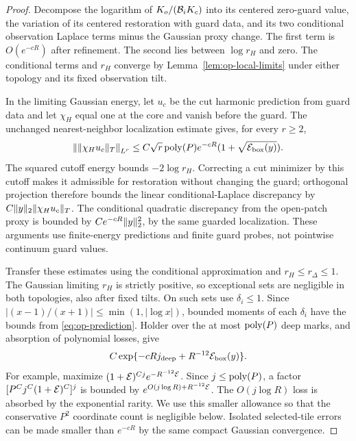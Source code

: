 \begin{proof}
Decompose the logarithm of
\(K_o/({\cal B}_iK_c)\) into its centered zero-guard value,
the variation of its centered restoration with guard data,
and its two conditional observation Laplace terms minus
the Gaussian proxy change.  The first term is
\(O(e^{-cR})\) after refinement.  The second lies between
\(\log r_H\) and zero.  The conditional terms and \(r_H\)
converge by Lemma~\ref{lem:op-local-limits} under either
topology and its fixed observation tilt.

In the limiting Gaussian energy, let \(u_c\) be the cut
harmonic prediction from guard data and let \(\chi_H\)
equal one at the core and vanish before the guard.
The unchanged nearest-neighbor localization estimate
 gives, for every \(r\geq2\),
\begin{equation}\label{eq:op-prediction}
 \left\|\lVert \chi_Hu_c\rVert_T\right\|_{L^r}
 \leq C\sqrt r\,{\rm poly}(P)e^{-cR}
                         (1+\sqrt{{\cal E}_{\rm box}(y)}).
\end{equation}
The squared cutoff energy bounds \(-2\log r_H\).
Correcting a cut minimizer by this cutoff makes it
admissible for restoration without changing the guard;
orthogonal projection therefore bounds the linear
conditional-Laplace discrepancy by
\(C\lVert y\rVert_2\lVert \chi_Hu_c\rVert_T\).
The conditional quadratic discrepancy from the open-patch
proxy is bounded by \(Ce^{-cR}\lVert y\rVert_2^2\), by the same
guarded localization.  These arguments use finite-energy
predictions and finite guard probes, not pointwise
continuum guard values.

Transfer these estimates using the conditional approximation
and \(r_H\leq r_\Delta\leq1\).  The Gaussian limiting
\(r_H\) is strictly positive, so exceptional sets are
negligible in both topologies, also after fixed tilts.
On such sets use \(\delta_i\leq1\).  Since
\(|(x-1)/(x+1)|\leq\min(1,|\log x|)\), bounded moments
of each \(\delta_i\) have the bounds from
\eqref{eq:op-prediction}.
Holder over the at most \({\rm poly}(P)\) deep marks,
and absorption of polynomial losses, give
\begin{equation}\label{eq:op-good-box}
 C\exp\{-cRj_{\rm deep}
                       +R^{-12}{\cal E}_{\rm box}(y)\}.
\end{equation}
For example, maximize
\((1+{\cal E})^{Cj}e^{-R^{-12}{\cal E}}\).
Since \(j\leq{\rm poly}(P)\), a factor
\([P^Cj^C(1+{\cal E})^C]^j\) is bounded by
\(e^{O(j\log R)+R^{-12}{\cal E}}\).
The \(O(j\log R)\) loss is absorbed by the exponential
rarity.  We use this smaller allowance so that the conservative
\(P^2\) coordinate count is negligible below.
Isolated selected-tile errors
can be made smaller than \(e^{-cR}\) by the same compact
Gaussian convergence.


\end{proof}
